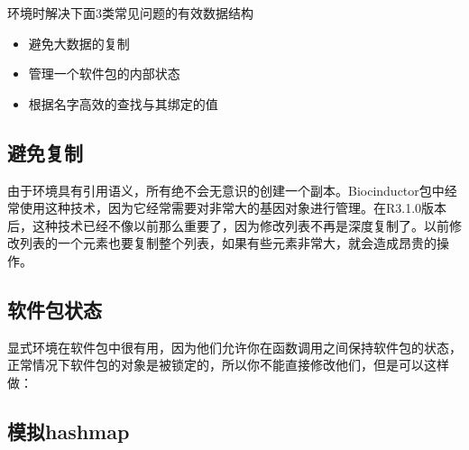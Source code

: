 \documentclass[]{book}
\newenvironment{Shaded}{\begin{snugshade}}{\end{snugshade}}
\newcommand{\KeywordTok}[1]{\textcolor[rgb]{0.13,0.29,0.53}{\textbf{#1}}}
\newcommand{\DataTypeTok}[1]{\textcolor[rgb]{0.13,0.29,0.53}{#1}}
\newcommand{\DecValTok}[1]{\textcolor[rgb]{0.00,0.00,0.81}{#1}}
\newcommand{\StringTok}[1]{\textcolor[rgb]{0.31,0.60,0.02}{#1}}
\newcommand{\CommentTok}[1]{\textcolor[rgb]{0.56,0.35,0.01}{\textit{#1}}}
\newcommand{\ControlFlowTok}[1]{\textcolor[rgb]{0.13,0.29,0.53}{\textbf{#1}}}
\newcommand{\OperatorTok}[1]{\textcolor[rgb]{0.81,0.36,0.00}{\textbf{#1}}}
\newcommand{\NormalTok}[1]{#1}
\begin{document}
环境时解决下面3类常见问题的有效数据结构

\begin{itemize}
\item
  避免大数据的复制
\item
  管理一个软件包的内部状态
\item
  根据名字高效的查找与其绑定的值
\end{itemize}

\subsection{避免复制}

由于环境具有引用语义，所有绝不会无意识的创建一个副本。Biocinductor包中经常使用这种技术，因为它经常需要对非常大的基因对象进行管理。在R3.1.0版本后，这种技术已经不像以前那么重要了，因为修改列表不再是深度复制了。以前修改列表的一个元素也要复制整个列表，如果有些元素非常大，就会造成昂贵的操作。

\subsection{软件包状态}

显式环境在软件包中很有用，因为他们允许你在函数调用之间保持软件包的状态，正常情况下软件包的对象是被锁定的，所以你不能直接修改他们，但是可以这样做：

\begin{Shaded}
\end{Shaded}

\subsection{模拟hashmap}\label{hashmap}
\end{document}
